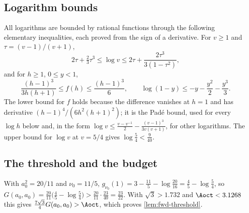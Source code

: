 \subsection{Logarithm bounds}\label{app:fwd-logs}

All logarithms are bounded by rational functions through the following elementary inequalities,
each proved from the sign of a derivative. For $v\ge1$ and $\tau=(v-1)/(v+1)$,
\[
2\tau+\tfrac23\tau^3\le\log v\le2\tau+\frac{2\tau^3}{3(1-\tau^2)},
\]
and for $h\ge1$, $0\le y<1$,
\[
\frac{(h-1)^3}{3h(h+1)}\le f(h)\le\frac{(h-1)^3}{6},\qquad
\log(1-y)\le-y-\frac{y^2}2-\frac{y^3}3 .
\]
The lower bound for $f$ holds because the difference vanishes at $h=1$ and has derivative
$(h-1)^4/(6h^2(h+1)^2)$; it is the Pad\'e bound, used for every $\log h$ below and, in the form
$\log v\le\frac{v-v^{-1}}2-\frac{(v-1)^3}{3v(v+1)}$, for other logarithms. The upper bound for
$\log v$ at $v=5/4$ gives $\log\frac54<\frac9{40}$.

\subsection{The threshold and the budget}\label{app:fwd-budget}

 With $a_0^2=20/11$ and $\nu_0=11/5$,
$g_{\nu_0}(1)=3-\frac{11}5-\log\frac{20}{16}=\frac45-\log\frac54$, so
$G(a_0,a_0)=\frac{20}{11}\bigl(\frac45-\log\frac54\bigr)>\frac{20}{11}\cdot\frac{23}{40}=\frac{23}{22}$.
With $\sqrt3>1.732$ and $\Aoct<3.1268$ this gives $\frac{7\sqrt3}4G(a_0,a_0)>\Aoct$, which proves
\cref{lem:fwd-threshold}.

